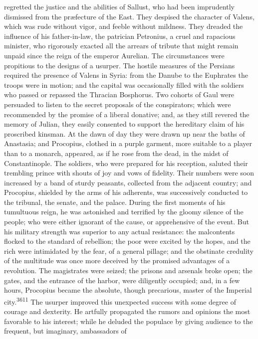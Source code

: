 regretted the justice and the abilities of Sallust, who had been
imprudently dismissed from the præfecture of the East. They
despised the character of Valens, which was rude without vigor,
and feeble without mildness. They dreaded the influence of his
father-in-law, the patrician Petronius, a cruel and rapacious
minister, who rigorously exacted all the arrears of tribute that
might remain unpaid since the reign of the emperor Aurelian. The
circumstances were propitious to the designs of a usurper. The
hostile measures of the Persians required the presence of Valens
in Syria: from the Danube to the Euphrates the troops were in
motion; and the capital was occasionally filled with the soldiers
who passed or repassed the Thracian Bosphorus. Two cohorts of
Gaul were persuaded to listen to the secret proposals of the
conspirators; which were recommended by the promise of a liberal
donative; and, as they still revered the memory of Julian, they
easily consented to support the hereditary claim of his
proscribed kinsman. At the dawn of day they were drawn up near
the baths of Anastasia; and Procopius, clothed in a purple
garment, more suitable to a player than to a monarch, appeared,
as if he rose from the dead, in the midst of Constantinople. The
soldiers, who were prepared for his reception, saluted their
trembling prince with shouts of joy and vows of fidelity. Their
numbers were soon increased by a band of sturdy peasants,
collected from the adjacent country; and Procopius, shielded by
the arms of his adherents, was successively conducted to the
tribunal, the senate, and the palace. During the first moments of
his tumultuous reign, he was astonished and terrified by the
gloomy silence of the people; who were either ignorant of the
cause, or apprehensive of the event. But his military strength
was superior to any actual resistance: the malcontents flocked to
the standard of rebellion; the poor were excited by the hopes,
and the rich were intimidated by the fear, of a general pillage;
and the obstinate credulity of the multitude was once more
deceived by the promised advantages of a revolution. The
magistrates were seized; the prisons and arsenals broke open; the
gates, and the entrance of the harbor, were diligently occupied;
and, in a few hours, Procopius became the absolute, though
precarious, master of the Imperial city.\textsuperscript{3611} The usurper
improved this unexpected success with some degree of courage and
dexterity. He artfully propagated the rumors and opinions the
most favorable to his interest; while he deluded the populace by
giving audience to the frequent, but imaginary, ambassadors of
